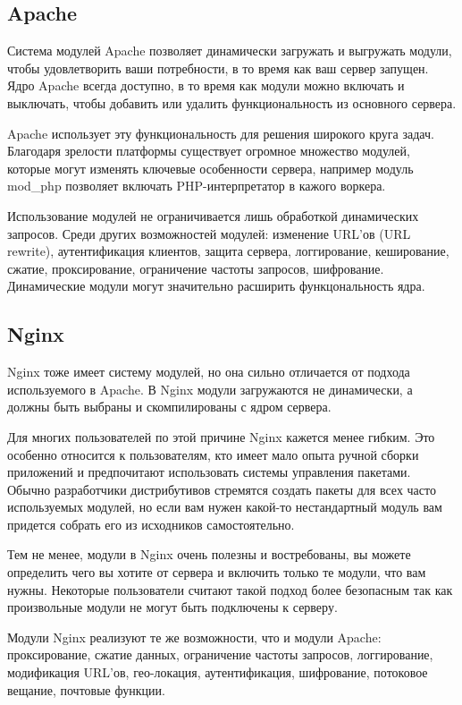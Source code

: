 \documentclass[14pt, a4paper]{article}
\begin{document}
\subsection*{Apache}
Система модулей Apache позволяет динамически загружать и выгружать модули, чтобы удовлетворить 
ваши потребности, в то время как ваш сервер запущен. Ядро Apache всегда доступно, в то время 
как модули можно включать и выключать, чтобы добавить или удалить функциональность из основного сервера.


Apache использует эту функциональность для решения широкого круга задач. Благодаря зрелости 
платформы существует огромное множество модулей, которые могут изменять ключевые особенности 
сервера, например модуль mod\_php позволяет включать PHP-интерпретатор в кажого воркера.


Использование модулей не ограничивается лишь обработкой динамических запросов. Среди других 
возможностей модулей: изменение URL'ов (URL rewrite), аутентификация клиентов, защита сервера, 
логгирование, кеширование, сжатие, проксирование, ограничение частоты запросов, шифрование. 
Динамические модули могут значительно расширить функцональность ядра.

\subsection*{Nginx}
Nginx тоже имеет систему модулей, но она сильно отличается от подхода используемого в Apache. 
В Nginx модули загружаются не динамически, а должны быть выбраны и скомпилированы с ядром сервера.


Для многих пользователей по этой причине Nginx кажется менее гибким. Это особенно относится 
к пользователям, кто имеет мало опыта ручной сборки приложений и предпочитают использовать 
системы управления пакетами. Обычно разработчики дистрибутивов стремятся создать пакеты для 
всех часто используемых модулей, но если вам нужен какой-то нестандартный модуль вам придется 
собрать его из исходников самостоятельно.


Тем не менее, модули в Nginx очень полезны и востребованы, вы можете определить чего вы хотите 
от сервера и включить только те модули, что вам нужны. Некоторые пользователи считают такой 
подход более безопасным так как произвольные модули не могут быть подключены к серверу.


Модули Nginx реализуют те же возможности, что и модули Apache: проксирование, сжатие данных, 
ограничение частоты запросов, логгирование, модификация URL'ов, гео-локация, аутентификация, 
шифрование, потоковое вещание, почтовые функции.\\
\end{document}
